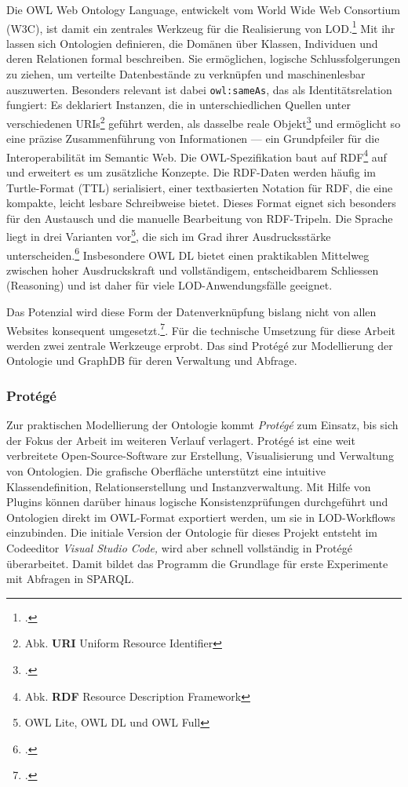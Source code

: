 \documentclass[12pt, a4paper, ngerman, bidi=default]{article}
\let\cite\footcite
\begin{document}
Die OWL Web Ontology Language, entwickelt vom World Wide Web Consortium (W3C), ist damit ein zentrales Werkzeug für die Realisierung von 
LOD.\cite[ vgl.][]{smith_owl_2004}
Mit ihr lassen sich Ontologien definieren, die Domänen über Klassen, Individuen und deren Relationen formal beschreiben. 
Sie ermöglichen, logische Schlussfolgerungen zu ziehen, um verteilte Datenbestände zu verknüpfen und maschinenlesbar auszuwerten.
Besonders relevant ist dabei \texttt{owl:sameAs}, das als Identitätsrelation fungiert: 
Es deklariert Instanzen, die in unterschiedlichen Quellen unter verschiedenen URIs\footnote{Abk. \textbf{URI}\: Uniform Resource Identifier} geführt werden, 
als dasselbe reale Objekt\cite[ vgl.][2.3. Data Aggregation and Privacy]{smith_owl_2004}
und ermöglicht so eine präzise Zusammenführung von Informationen — ein Grundpfeiler für die Interoperabilität im Semantic Web.
Die OWL-Spezifikation baut auf RDF\footnote{Abk. \textbf{RDF}\; Resource Description Framework} auf und erweitert es um zusätzliche Konzepte.
Die RDF-Daten werden häufig im Turtle-Format (TTL) serialisiert, einer textbasierten Notation für RDF, die eine kompakte, leicht lesbare Schreibweise bietet.
Dieses Format eignet sich besonders für den Austausch und die manuelle Bearbeitung von RDF-Tripeln.
Die Sprache liegt in drei Varianten vor\footnote{OWL Lite, OWL DL und OWL Full}, die sich im Grad ihrer Ausdrucksstärke 
unterscheiden.\cite[ vgl.][1.1. The Species of OWL.]{smith_owl_2004}
Insbesondere OWL DL bietet einen praktikablen Mittelweg zwischen hoher Ausdruckskraft und vollständigem, entscheidbarem Schliessen (Reasoning) 
und ist daher für viele LOD-Anwendungsfälle geeignet.

Das Potenzial wird diese Form der Datenverknüpfung bislang nicht von allen Websites konsequent 
umgesetzt.\cite[ vgl.][S. 14]{garoufallou_metadata_2020}. Für die technische 
Umsetzung für diese Arbeit werden zwei zentrale Werkzeuge erprobt. Das sind Protégé zur Modellierung der Ontologie und GraphDB für deren Verwaltung und Abfrage.

\subsubsection{Protégé} Zur praktischen Modellierung der Ontologie kommt \textit{Protégé} zum Einsatz, bis sich der Fokus der Arbeit im weiteren Verlauf verlagert. 
Protégé ist eine weit verbreitete Open-Source-Software zur Erstellung, Visualisierung und Verwaltung von Ontologien.
Die grafische Oberfläche unterstützt eine intuitive Klassendefinition, 
Relationserstellung und Instanzverwaltung. 
Mit Hilfe von Plugins können darüber hinaus logische Konsistenzprüfungen durchgeführt und 
Ontologien direkt im OWL-Format exportiert werden, um sie in LOD-Workflows einzubinden.
Die initiale Version der Ontologie für dieses Projekt entsteht im Codeeditor \textit{Visual Studio Code,} wird aber schnell vollständig in Protégé überarbeitet.
Damit bildet das Programm die Grundlage für erste Experimente mit Abfragen in SPARQL.%
\end{document}
